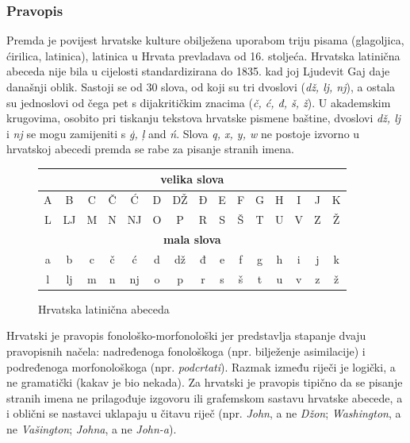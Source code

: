 \begin{multicols}{2}
\subsubsection{Pravopis}

Premda je povijest hrvatske kulture obilježena uporabom triju pisama (glagoljica, ćirilica, latinica), latinica u Hrvata prevladava od 16. stoljeća. Hrvatska latinična abeceda nije bila u cijelosti standardizirana do 1835. kad joj Ljudevit Gaj daje današnji oblik. Sastoji se od 30 slova, od koji su tri dvoslovi (\emph{dž, lj, nj}), a ostala su jednoslovi od čega pet s dijakritičkim znacima (\emph{č, ć, đ, š, ž}). U akademskim krugovima, osobito pri tiskanju tekstova hrvatske pismene baštine, dvoslovi \emph{dž, lj} i \emph{nj} se mogu zamijeniti s \emph{ģ, ļ} and \emph{ń}. Slova \emph{q, x, y, w} ne postoje izvorno u hrvatskoj abecedi premda se rabe za pisanje stranih imena.

\begin{figure}[htb]
\centering
	\begin{tabular} {|c|c|c|c|c|c|c|c|c|c|c|c|c|c|c|}
        \hline
        \multicolumn{15}{|c|}{\textbf{velika slova}} \\ \hline
        A & B  & C & Č & Ć  & D & DŽ & Đ & E & F & G & H & I & J & K \\ \hline
        L & LJ & M & N & NJ & O & P  & R & S & Š & T & U & V & Z & Ž \\ \hline
        \multicolumn{15}{|c|}{\textbf{mala slova}} \\ \hline
        a & b  & c & č & ć  & d & dž & đ & e & f & g & h & i & j & k \\ \hline
        l & lj & m & n & nj & o & p  & r & s & š & t & u & v & z & ž \\
        \hline
   \end{tabular}
  \caption{Hrvatska latinična abeceda}
  \label{fig:abeceda}
\end{figure}

Hrvatski je pravopis fonološko-morfonološki jer predstavlja stapanje dvaju pravopisnih načela: nadređenoga fonološkoga (npr. bilježenje asimilacije) i podređenoga morfonološkoga (npr. \emph{podcrtati}). Razmak između riječi je logički, a ne gramatički (kakav je bio nekada). Za hrvatski je pravopis tipično da se pisanje stranih imena ne prilagođuje izgovoru ili grafemskom sastavu hrvatske abecede, a i oblični se nastavci uklapaju u čitavu riječ (npr. \emph{John}, a ne \emph{Džon}; \emph{Washington}, a ne \emph{Vašington}; \emph{Johna}, a ne \emph{John-a}).


\end{multicols}
